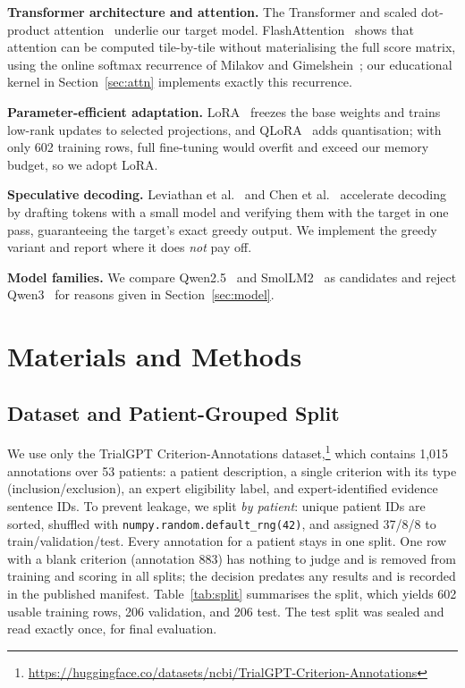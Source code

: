 \documentclass[conference]{IEEEtran}
\begin{document}
\textbf{Transformer architecture and attention.} The Transformer and scaled
dot-product attention~\cite{vaswani2017attention} underlie our target model.
FlashAttention~\cite{dao2022flashattention} shows that attention can be computed
tile-by-tile without materialising the full score matrix, using the online
softmax recurrence of Milakov and Gimelshein~\cite{milakov2018online}; our
educational kernel in Section~\ref{sec:attn} implements exactly this recurrence.

\textbf{Parameter-efficient adaptation.} LoRA~\cite{hu2022lora} freezes the base
weights and trains low-rank updates to selected projections, and
QLoRA~\cite{dettmers2023qlora} adds quantisation; with only 602 training rows,
full fine-tuning would overfit and exceed our memory budget, so we adopt LoRA.

\textbf{Speculative decoding.} Leviathan et
al.~\cite{leviathan2023speculative} and Chen et al.~\cite{chen2023accelerating}
accelerate decoding by drafting tokens with a small model and verifying them
with the target in one pass, guaranteeing the target's exact greedy output. We
implement the greedy variant and report where it does \emph{not} pay off.

\textbf{Model families.} We compare Qwen2.5~\cite{qwen2024report} and
SmolLM2~\cite{allal2025smollm2} as candidates and reject
Qwen3~\cite{qwen2025qwen3} for reasons given in Section~\ref{sec:model}.

\section{Materials and Methods}

\subsection{Dataset and Patient-Grouped Split}
We use only the TrialGPT Criterion-Annotations
dataset,\footnote{\url{https://huggingface.co/datasets/ncbi/TrialGPT-Criterion-Annotations}}
which contains 1{,}015 annotations over 53 patients: a patient description, a
single criterion with its type (inclusion/exclusion), an expert eligibility
label, and expert-identified evidence sentence IDs. To prevent leakage, we split
\emph{by patient}: unique patient IDs are sorted, shuffled with
\texttt{numpy.random.default\_rng(42)}, and assigned 37/8/8 to
train/validation/test. Every annotation for a patient stays in one split. One
row with a blank criterion (annotation 883) has nothing to judge and is removed
from training and scoring in all splits; the decision predates any results and
is recorded in the published manifest. Table~\ref{tab:split} summarises the
split, which yields 602 usable training rows, 206 validation, and 206 test. The
test split was sealed and read exactly once, for final evaluation.
\end{document}
